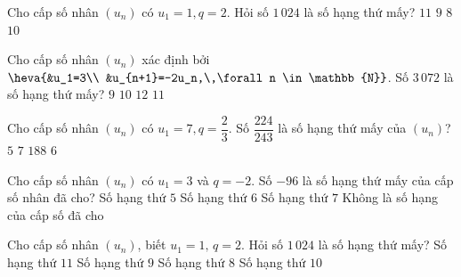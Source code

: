 \begin{ex}%
	Cho cấp số nhân $\left(u_n \right)$ có $u_1=1, q=2$.  Hỏi số $1\,024$ là số hạng thứ mấy?
	 \choice
		{\True  $11$}
		 {$9$}
		{$8$} 
		{$10$} 
\end{ex}

\begin{ex}%
	Cho cấp số nhân $(u_n)$ xác định bởi $\heva{&u_1=3\\ &u_{n+1}=-2u_n,\,\forall n  \in \mathbb{N}}$. Số $3\,072$ là số hạng thứ mấy?
	 \choice
		 {$9$}
		 {$10$}
		 {$12$}
		{\True  $11$}
\end{ex}

\begin{ex}%
	Cho cấp số nhân $(u_n)$ có  $u_1=7,q=\dfrac{2}{3}$. Số $\dfrac{224}{243}$ là số hạng thứ mấy của $(u_n)$?
	\choice 
		 {$5$}
		{$7$} 
		 {$188$}
		 {\True $6$}
\end{ex}

\begin{ex}%
	Cho cấp số nhân  $(u_n)$ có $u_1=3$ và $q=-2$. Số $-96$ là số hạng thứ mấy của cấp số nhân đã cho?
	 \choice
		{Số hạng thứ  $5$}
		{\True Số hạng  thứ $6$}
		{Số  hạng thứ $7$}
		{Không  là số hạng của cấp số đã cho}
\end{ex}

\begin{ex}%
	Cho cấp số nhân $(u_n)$, biết $u_1=1,\,q=2$. Hỏi  số $1\,024$ là số hạng thứ mấy?
	 \choice
		{\True Số hạng  thứ $11$}
		{Số  hạng thứ $9$}
		{Số  hạng thứ $8$}
		{Số hạng thứ  $10$}
\end{ex}

